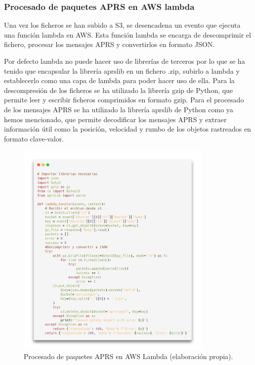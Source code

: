 \subsubsection*{Procesado de paquetes APRS en AWS lambda}

Una vez los ficheros se han subido a S3, se desencadena un evento que ejecuta una función lambda en AWS. Esta función lambda se encarga de descomprimir el fichero, procesar los mensajes APRS y convertirlos en formato JSON.

Por defecto lambda no puede hacer uso de librerías de terceros por lo que se ha tenido que encapsular la librería aprslib en un fichero .zip, subirlo a lambda y establecerlo como una capa de lambda para poder hacer uso de ella.
Para la descompresión de los ficheros se ha utilizado la librería gzip de Python, que permite leer y escribir ficheros comprimidos en formato gzip.
Para el procesado de los mensajes APRS se ha utilizado la librería aprslib de Python como ya hemos mencionado, que permite decodificar los mensajes APRS y extraer información útil como la posición, velocidad y rumbo de los objetos rastreados en formato clave-valor.

\begin{figure}
	\centering
	\includegraphics[width=0.85\textwidth]{Imagenes/Chapter_4/lambda.png}
	\caption[Procesado de paquetes APRS en AWS Lambda.]{Procesado de paquetes APRS en AWS Lambda (elaboración propia).}
	\label{fig:aws-lambda}
\end{figure}

